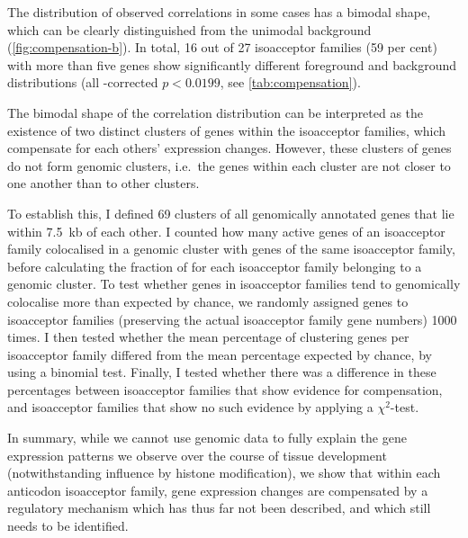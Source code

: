 The distribution of observed correlations in some cases has a bimodal shape,
which can be clearly distinguished from the unimodal background
(\cref{fig:compensation-b}). In total, \num{16} out of \num{27} isoacceptor
families (\num{59} per cent) with more than five genes show significantly
different foreground and background distributions (all \fdr-corrected \(p <
0.0199\), see \cref{tab:compensation}).

The bimodal shape of the correlation distribution can be interpreted as the
existence of two distinct clusters of \trna genes within the isoacceptor
families, which compensate for each others’ expression changes. However, these
clusters of genes do not form genomic clusters, i.e.\ the \trna genes within
each cluster are not closer to one another than to other clusters.

To establish this, I defined \num{69} clusters of all genomically annotated
\trna genes that lie within \SI{7.5}{kb} of each other. I counted how many
active \trna genes of an isoacceptor family colocalised in a genomic cluster
with \trna genes of the same isoacceptor family, before calculating the fraction
of \trna for each isoacceptor family belonging to a genomic cluster. To test
whether genes in isoacceptor families tend to genomically colocalise more than
expected by chance, we randomly assigned \trna genes to isoacceptor families
(preserving the actual isoacceptor family gene numbers) \num{1000} times. I then
tested whether the mean percentage of clustering \trna genes per isoacceptor
family differed from the mean percentage expected by chance, by using a binomial
test. Finally, I tested whether there was a difference in these percentages
between isoacceptor families that show evidence for compensation, and
isoacceptor families that show no such evidence by applying a \(\chi^2\)-test.

\parrule

In summary, while we cannot use genomic data to fully explain the \trna gene
expression patterns we observe over the course of tissue development
(notwithstanding influence by histone modification), we show that within each
anticodon isoacceptor family, \trna gene expression changes are compensated by a
regulatory mechanism which has thus far not been described, and which still
needs to be identified.

